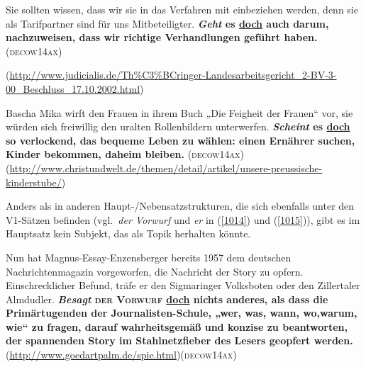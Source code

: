 \begin{exe}
	\ex\label{1012} 

	Sie sollten wissen, dass wir sie in das Verfahren mit einbeziehen werden, denn sie als Tarifpartner sind für uns Mitbeteiligter. \textbf{\textit{Geht} 		es \ul{doch} auch darum, nachzuweisen, dass wir richtige Verhandlungen geführt haben.  }	  		
	\hfill\hbox{\scshape(decow14ax)}
	\begin{sloppypar}
	{\scriptsize(\url{http://www.judicialis.de/Th\%C3\%BCringer-Landesarbeitsgericht\_2-BV-3-00\_Beschluss\_17.10.2002.html})}\end{sloppypar}
\end{exe}\largerpage[2]
										           
\begin{exe}
	\ex\label{1013} 

	Bascha Mika wirft den Frauen in ihrem Buch „Die Feigheit der Frauen“ vor, sie würden sich freiwillig den uralten Rollenbildern unterwerfen. 		\linebreak\textbf{\textit{Scheint} es \ul{doch} so verlockend, das bequeme Leben zu wählen: einen Ernährer suchen, Kinder bekommen, daheim bleiben.} 		
	\hfill\hbox{\scshape(decow14ax)}
	\newline
	{\scriptsize(\url{http://www.christundwelt.de/themen/detail/artikel/unsere-preussische-kinderstube/})}
\end{exe}	
Anders als in anderen Haupt-/Nebensatzstrukturen, die sich ebenfalls unter den V1-Sätzen befinden (vgl.\ \textit{der Vorwurf} und \textit{er} in (\ref{1014}) und (\ref{1015})), gibt es im Hauptsatz kein Subjekt, das als Topik herhalten könnte. 

\begin{exe}
	\ex\label{1014} 

	Nun hat Magnus-Essay-Enzensberger bereits 1957 dem deutschen Nachrichtenmagazin vorgeworfen, die Nachricht der Story zu opfern. Ein\linebreak schrecklicher Befund, träfe er den Sigmaringer Volksboten oder den Zillertaler Almdudler. \textbf{\textit{Besagt} \textsc{der Vorwurf} \ul{doch} nichts anderes, als dass die Primärtugenden der Journalisten-Schule, „wer, was, wann, wo,\linebreak warum, wie“ zu fragen, darauf wahrheitsgemäß und konzise zu beantworten, der spannenden Story im Stahlnetzfieber des Lesers geopfert werden.		}
	{\scriptsize(\url{http://www.goedartpalm.de/spie.html})}\hfill\hbox{\scshape(decow14ax)}
\end{exe}	


